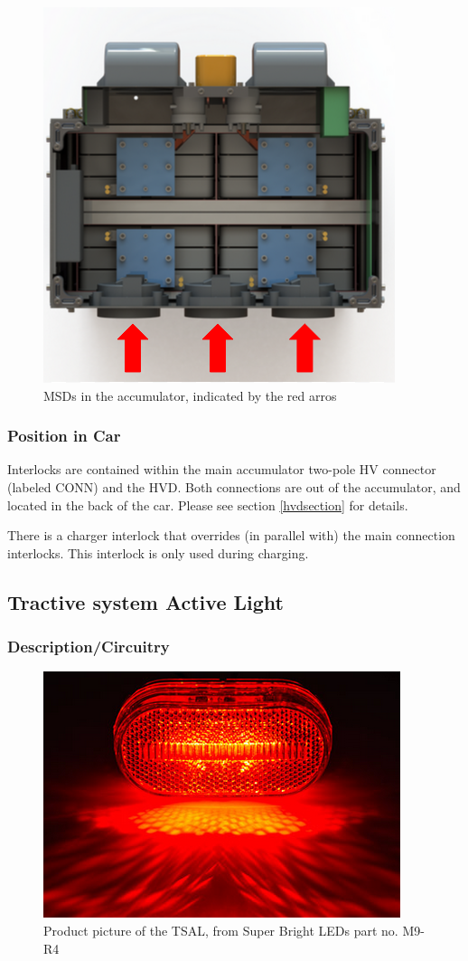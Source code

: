 \documentclass{article}
\begin{document}
            \begin{figure}[H]
                \centering
                \includegraphics[width = 0.3 \textwidth]{MSD}
                \caption{MSDs in the accumulator, indicated by the red arros}
                \label{MSDs}
            \end{figure}

        \subsubsection{Position in Car}

            Interlocks are contained within the main accumulator two-pole HV connector (labeled CONN) and the HVD. Both connections are out of the accumulator, and located in the back of the car. Please see section \ref{hvdsection} for details. 
            
            There is a charger interlock that overrides (in parallel with) the main connection interlocks. This interlock is only used during charging. 
            
    \subsection{Tractive system Active Light}

        \subsubsection{Description/Circuitry}

            \begin{figure}[H]
                \centering
                \includegraphics[width = 0.5 \textwidth]{TSALshining}
                \caption{Product picture of the TSAL, from Super Bright LEDs part no. M9-R4}
                \label{tsalsuperbright}
            \end{figure}
\end{document}
